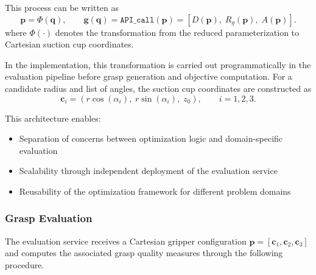 This process can be written as
\begin{equation}
    \mathbf{p} = \Phi(\mathbf{q}),
    \qquad
    \mathbf{g}(\mathbf{q})
    =
    \texttt{API\_call}(\mathbf{p})
    =
    [D(\mathbf{p}),\;R_g(\mathbf{p}),\;A(\mathbf{p})].
\end{equation}
where $\Phi(\cdot)$ denotes the transformation from the reduced parameterization to Cartesian
suction cup coordinates.

In the implementation, this transformation is carried out programmatically in the evaluation
pipeline before grasp generation and objective computation. For a candidate radius and list of
angles, the suction cup coordinates are constructed as
\begin{equation}
    \mathbf{c}_i = (r\cos(\alpha_i),\; r\sin(\alpha_i),\; z_0),
    \qquad i=1,2,3.
\end{equation}

This architecture enables:
\begin{itemize}
    \item Separation of concerns between optimization logic and domain-specific evaluation
    \item Scalability through independent deployment of the evaluation service
    \item Reusability of the optimization framework for different problem domains
\end{itemize}

\subsubsection{Grasp Evaluation}
\label{sec:grasp_eval_sc}

The evaluation service receives a Cartesian gripper configuration $\mathbf{p} =
[\mathbf{c}_1,\mathbf{c}_2,\mathbf{c}_3]$ and computes the associated grasp quality measures through
the following procedure.

